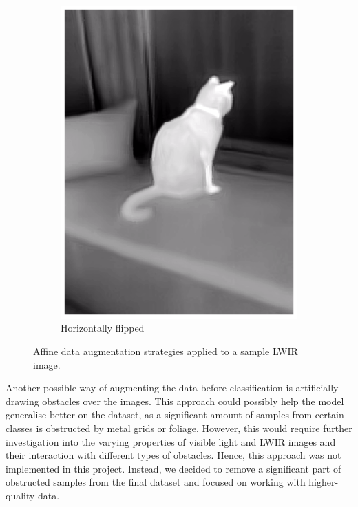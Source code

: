 \documentclass{l4proj}
\begin{document}
\begin{figure}[ht]
\begin{subfigure}[h!]{0.24\textwidth}
    \includegraphics[width=\textwidth]{images/augmentation/flipped.png}
    \caption{Horizontally flipped}
  \end{subfigure}
  \caption{Affine data augmentation strategies applied to a sample LWIR image.}
  \label{fig:augmentation_affine}
\end{figure}

Another possible way of augmenting the data before classification is artificially drawing obstacles over the images. This approach could possibly help the model generalise better on the dataset, as a significant amount of samples from certain classes is obstructed by metal grids or foliage. However, this would require further investigation into the varying properties of visible light and LWIR images and their interaction with different types of obstacles. Hence, this approach was not implemented in this project. Instead, we decided to remove a significant part of obstructed samples from the final dataset and focused on working with higher-quality data. 
\end{document}
